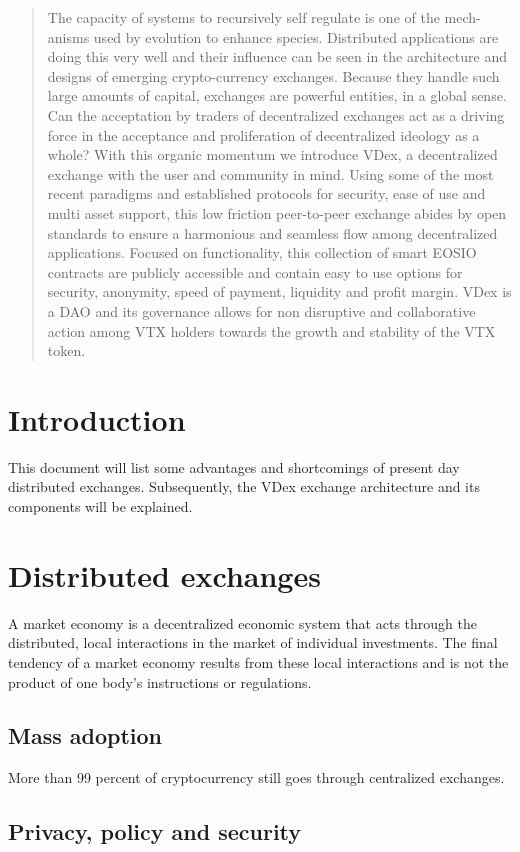 \documentclass[]{article}
\begin{document}
\begin{abstract}
The capacity of systems to recursively self regulate is one of the mech-
anisms used by evolution to enhance species. Distributed applications are
doing this very well and their influence can be seen in the architecture
and designs of emerging crypto-currency exchanges. Because they handle
such large amounts of capital, exchanges are powerful entities, in a global
sense. Can the acceptation by traders of decentralized exchanges act as a
driving force in the acceptance and proliferation of decentralized ideology
as a whole? 
With this organic momentum we introduce VDex, a decentralized exchange 
with the user and community in mind. Using some of the most recent paradigms 
and established protocols for security, ease of use and multi asset support, 
this low friction peer-to-peer exchange abides by open standards to ensure 
a harmonious and seamless flow among decentralized applications. 
Focused on functionality, this collection of smart EOSIO contracts are 
publicly accessible and contain easy to use options for security, anonymity, 
speed of payment, liquidity and profit margin.
VDex is a DAO and its governance allows for non disruptive and collaborative action among VTX holders towards the growth and stability of the
VTX token.
\end{abstract}
\section{Introduction}
This document will list some advantages and shortcomings of present 
day distributed exchanges. 
Subsequently, the VDex exchange architecture and its components will be explained.

\section{Distributed exchanges}
	A market economy is a decentralized economic system that acts through the distributed, 
	local interactions in the market of individual investments. 
	The final tendency of a market economy results from these local 
	interactions and is not the product of one body's instructions or regulations.
	\subsection{Mass adoption}
	More than 99 percent of cryptocurrency still goes through centralized exchanges.
	\subsection{Privacy, policy and security}
\end{document}
